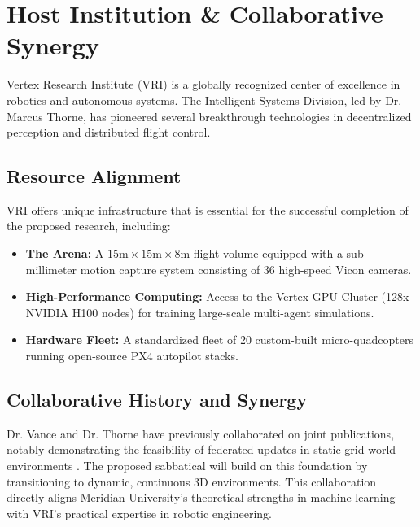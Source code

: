 \section{Host Institution \& Collaborative Synergy}
Vertex Research Institute (VRI) is a globally recognized center of excellence in robotics and autonomous systems. The Intelligent Systems Division, led by Dr. Marcus Thorne, has pioneered several breakthrough technologies in decentralized perception and distributed flight control.

\subsection{Resource Alignment}
VRI offers unique infrastructure that is essential for the successful completion of the proposed research, including:
\begin{itemize}
    \item \textbf{The Arena:} A $15\text{m} \times 15\text{m} \times 8\text{m}$ flight volume equipped with a sub-millimeter motion capture system consisting of 36 high-speed Vicon cameras.
    \item \textbf{High-Performance Computing:} Access to the Vertex GPU Cluster (128x NVIDIA H100 nodes) for training large-scale multi-agent simulations.
    \item \textbf{Hardware Fleet:} A standardized fleet of 20 custom-built micro-quadcopters running open-source PX4 autopilot stacks.
\end{itemize}

\subsection{Collaborative History and Synergy}
Dr. Vance and Dr. Thorne have previously collaborated on joint publications, notably demonstrating the feasibility of federated updates in static grid-world environments \cite{vance2024federated}. The proposed sabbatical will build on this foundation by transitioning to dynamic, continuous 3D environments. This collaboration directly aligns Meridian University's theoretical strengths in machine learning with VRI's practical expertise in robotic engineering.

